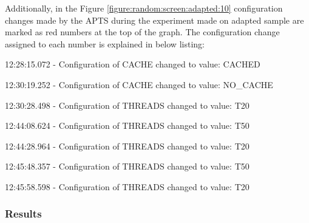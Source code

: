 \documentclass[12pt,a4paper]{article}
\let\tmpone\enumerate
\let\tmptwo\endenumerate
\renewenvironment{enumerate}{\tmpone\addtolength{\itemsep}{-0.4\baselineskip}}{\tmptwo}
\begin{document}
Additionally, in the Figure \ref{figure:random:screen:adapted:10} configuration changes made by the APTS during the experiment made on adapted sample are marked as red numbers at the top of the graph. The configuration change assigned to each number is explained in below listing: 

\begin{enumerate}
\item 12:28:15.072 - Configuration of CACHE changed to value: CACHED
\item 12:30:19.252 - Configuration of CACHE changed to value: NO\_CACHE
\item 12:30:28.498 - Configuration of THREADS changed to value: T20
\item 12:44:08.624 - Configuration of THREADS changed to value: T50
\item 12:44:28.964 - Configuration of THREADS changed to value: T20
\item 12:45:48.357 - Configuration of THREADS changed to value: T50
\item 12:45:58.598 - Configuration of THREADS changed to value: T20
\end{enumerate}

\subsubsection{Results} 
\end{document}
